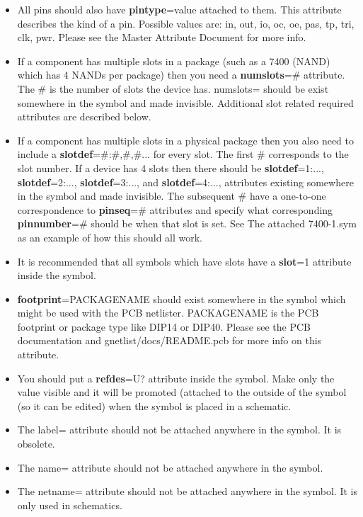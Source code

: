\documentclass{article}
\begin{document}
\begin{itemize}
\item All pins should also have {\bf pintype}=value attached to them.
      This attribute describes the kind of a pin.  Possible values are:
      in, out, io, oc, oe, pas, tp, tri, clk, pwr.  Please see the Master
      Attribute Document for more info.

\item If a component has multiple slots in a package (such as
      a 7400 (NAND) which has 4 NANDs per package) then you need a
      {\bf numslots}=\# attribute.  The \# is the number of
      slots the device has.  numslots= should be exist somewhere in
      the symbol and made invisible.  Additional slot related required
      attributes are described below.

\item If a component has multiple slots in a physical package then you
      also need to include a {\bf slotdef}=\#:\#,\#,\#...
      for every slot.  The first \# corresponds to the slot number.
      If a device has 4 slots then there should be {\bf slotdef}=1:...,
      {\bf slotdef}=2:..., {\bf slotdef}=3:..., and {\bf slotdef}=4:...,
      attributes existing somewhere in the symbol and made invisible.
      The subsequent \# have a one-to-one correspondence to {\bf pinseq}=\#
      attributes and specify what corresponding {\bf pinnumber}=\#
      should be when that slot is set.  See The attached 7400-1.sym as
      an example of how this should all work.

\item It is recommended that all symbols which have slots have a {\bf
      slot}=1 attribute inside the symbol.

\item {\bf footprint}=PACKAGENAME should exist somewhere in the symbol
      which might be used with the PCB netlister.  PACKAGENAME is the
      PCB footprint or package type like DIP14 or DIP40.  Please see
      the PCB documentation and gnetlist/docs/README.pcb for more info
      on this attribute.

\item You should put a {\bf refdes}=U? attribute inside the symbol.
      Make only the value visible and it will be promoted (attached to
      the outside of the symbol (so it can be edited) when the symbol
      is placed in a schematic.

\item The label= attribute should not be attached anywhere in
      the symbol.  It is obsolete.  

\item The name= attribute should not be attached anywhere in the symbol.

\item The netname= attribute should not be attached anywhere in the
      symbol.  It is only used in schematics.

\end{itemize}
\end{document}
